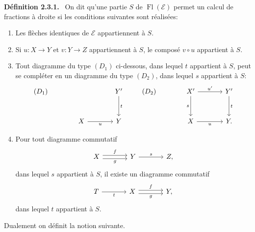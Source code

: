 \documentclass[11pt]{article}
\newenvironment{statement}[1]{\par\medskip\noindent\textbf{#1.}\ }{\par\medskip}
\providecommand{\Fl}{\operatorname{Fl}}
\providecommand{\cE}{\mathcal E}
\begin{document}
\begin{statement}{Définition 2.3.1}
On dit qu'une partie $S$ de $\Fl(\cE)$ permet un calcul de fractions à droite si les conditions suivantes sont réalisées:
\begin{enumerate}[label=(\alph*)]
\item Les flèches identiques de $\cE$ appartiennent à $S$.
\item Si $u:X\to Y$ et $v:Y\to Z$ appartiennent à $S$, le composé $v\circ u$ appartient à $S$.
\item Tout diagramme du type $(D_1)$ ci-dessous, dans lequel $t$ appartient à $S$, peut se compléter en un diagramme du type $(D_2)$, dans lequel $s$ appartient à $S$:
\[
\begin{tikzcd}[column sep=large,row sep=large]
(D_1)& & Y' \arrow[d,"t"]\\
& X \arrow[r,"u"'] & Y
\end{tikzcd}
\qquad
\begin{tikzcd}[column sep=large,row sep=large]
(D_2)& X' \arrow[r,"u'"] \arrow[d,"s"'] & Y' \arrow[d,"t"]\\
& X \arrow[r,"u"'] & Y .
\end{tikzcd}
\]
\item Pour tout diagramme commutatif
\[
\begin{tikzcd}[column sep=large]
X \arrow[r,shift left,"f"] \arrow[r,shift right,"g"'] & Y \arrow[r,"s"] & Z,
\end{tikzcd}
\]
dans lequel $s$ appartient à $S$, il existe un diagramme commutatif
\[
\begin{tikzcd}[column sep=large]
T \arrow[r,"t"'] & X \arrow[r,shift left,"f"] \arrow[r,shift right,"g"'] & Y,
\end{tikzcd}
\]
dans lequel $t$ appartient à $S$.
\end{enumerate}
\end{statement}

Dualement on définit la notion suivante.
\end{document}
